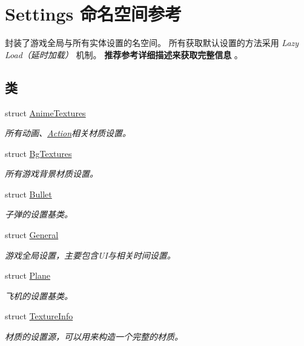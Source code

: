 \hypertarget{namespace_settings}{}\section{Settings 命名空间参考}
\label{namespace_settings}


封装了游戏全局与所有实体设置的名空间。 所有获取默认设置的方法采用 {\itshape Lazy Load（延时加载）} 机制。 {\bfseries 推荐参考详细描述来获取完整信息} 。  


\subsection*{类}
\begin{DoxyCompactItemize}
\item 
struct \hyperlink{struct_settings_1_1_anime_textures}{Anime\+Textures}
\begin{DoxyCompactList}\small\item\em 所有动画、\hyperlink{class_action}{Action}相关材质设置。 \end{DoxyCompactList}\item 
struct \hyperlink{struct_settings_1_1_bg_textures}{Bg\+Textures}
\begin{DoxyCompactList}\small\item\em 所有游戏背景材质设置。 \end{DoxyCompactList}\item 
struct \hyperlink{struct_settings_1_1_bullet}{Bullet}
\begin{DoxyCompactList}\small\item\em 子弹的设置基类。 \end{DoxyCompactList}\item 
struct \hyperlink{struct_settings_1_1_general}{General}
\begin{DoxyCompactList}\small\item\em 游戏全局设置，主要包含\+U\+I与相关时间设置。 \end{DoxyCompactList}\item 
struct \hyperlink{struct_settings_1_1_plane}{Plane}
\begin{DoxyCompactList}\small\item\em 飞机的设置基类。 \end{DoxyCompactList}\item 
struct \hyperlink{struct_settings_1_1_texture_info}{Texture\+Info}
\begin{DoxyCompactList}\small\item\em 材质的设置源，可以用来构造一个完整的材质。 \end{DoxyCompactList}\end{DoxyCompactItemize}
